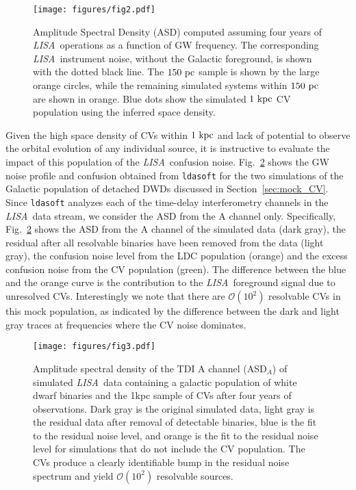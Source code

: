 \documentclass[fleqn,usenatbib]{mnras}
\newcommand{\lisa}{{\it LISA}}
\begin{document}
\begin{figure}
	\texttt{[image: figures/fig2.pdf]}
    \caption{Amplitude Spectral Density (ASD) computed assuming four years of \lisa\ operations as a function of GW frequency. The corresponding \lisa\ instrument noise, without the Galactic foreground, is shown with the dotted black line. The $150~\rm{pc}$ \citet{pala20} sample is shown by the large orange circles, while the remaining simulated systems within $150~\rm{pc}$ are shown in orange. Blue dots show the simulated $1~\rm{kpc}$ CV population using the inferred \citet{pala20} space density.}
    \label{fig:asd}
\end{figure}


Given the high space density of CVs within $1~\rm{kpc}$ and lack of potential to observe the orbital evolution of any individual source, it is instructive to evaluate the impact of this population of the \lisa\ confusion noise. 
Fig.~\ref{fig:isd} shows the GW noise profile and confusion obtained from \texttt{ldasoft} \citep{ldasoft} for the two simulations of the Galactic population of detached DWDs discussed in Section~\ref{sec:mock_CV}. Since \texttt{ldasoft} analyzes each of the time-delay interferometry channels in the \lisa\ data stream, we consider the ASD from the A channel only. Specifically, Fig.~\ref{fig:isd} shows the ASD from the A channel of the simulated data (dark gray), the residual after all resolvable binaries have been removed from the data (light gray), the confusion noise level from the LDC population (orange) and the excess confusion noise from the CV population (green). The difference between the blue and the orange curve is the contribution to the \lisa\ foreground signal due to unresolved CVs. Interestingly we note that there are $\mathcal{O}(10^2)$ resolvable CVs in this mock population, as indicated by the difference between the dark and light gray traces at frequencies where the CV noise dominates.

\begin{figure}
	\texttt{[image: figures/fig3.pdf]}
    \caption{Amplitude spectral density of the TDI A channel (ASD$_A$)  of simulated \lisa\ data containing a galactic population of white dwarf binaries and the 1kpc sample of CVs after four years of observations. Dark gray is the original simulated data, light gray is the residual data after removal of detectable binaries, blue is the fit to the residual noise level, and orange is the fit to the residual noise level for simulations that do not include the CV population. The CVs produce a clearly identifiable bump in the residual noise spectrum and yield $\mathcal{O}(10^2)$ resolvable sources.}
    \label{fig:isd}
\end{figure}
\end{document}
